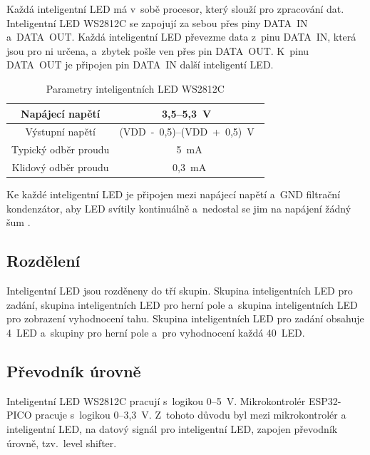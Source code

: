   Každá inteligentní LED má v~sobě procesor, který slouží pro zpracování dat. 
  Inteligentní LED WS2812C se zapojují za sebou přes piny DATA~IN a~DATA~OUT. Každá inteligentní LED převezme data z~pinu 
  DATA~IN, která jsou pro ni určena, a~zbytek pošle ven přes pin DATA~OUT. K~pinu DATA~OUT je připojen pin DATA~IN další inteligentí LED. 

  \begin{table}[!h]
    \caption{Parametry inteligentních LED WS2812C \cite{WS2812C_datasheet}}
    \begin{center}
        \begin{tabular}{|c|c|}
            \hline
            {\cellcolor[HTML]{C0C0C0}Napájecí napětí} & 3,5--5,3~V~\\
            \hline
            {\cellcolor[HTML]{C0C0C0}Výstupní napětí} & (VDD~-~0,5)--(VDD~+~0,5)~V~\\
            \hline
            {\cellcolor[HTML]{C0C0C0}Typický odběr proudu}  & 5~mA \\
            \hline
            {\cellcolor[HTML]{C0C0C0}Klidový odběr proudu}  & 0,3~mA \\
            \hline
        \end{tabular}    
    \end{center}
  \end{table}

  Ke každé inteligentní LED je připojen mezi napájecí napětí a~GND filtrační kondenzátor, aby LED svítily kontinuálně 
  a~nedostal se jim na napájení žádný šum \cite{WS2812C_datasheet}.

  \subsection{Rozdělení}
  Inteligentní LED jsou rozděneny do tří skupin. Skupina inteligentních LED pro zadání, skupina inteligentních LED pro herní pole 
  a~skupina inteligentních LED pro zobrazení vyhodnocení tahu.
  Skupina inteligentních LED pro zadání obsahuje 4~LED a~skupiny pro herní pole a~pro vyhodnocení každá 40~LED.

  \subsection{Převodník úrovně}
  Inteligentní LED WS2812C pracují s~logikou 0--5~V. Mikrokontrolér ESP32-PICO pracuje s~logikou 0--3,3~V. 
  Z~tohoto důvodu byl mezi mikrokontrolér a inteligentní LED, na datový signál pro inteligentní LED, zapojen převodník úrovně, 
  tzv.~level shifter. 
  
